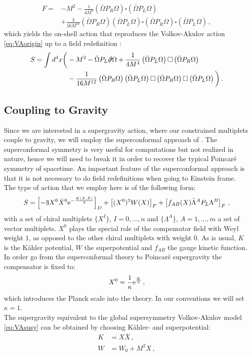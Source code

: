 \documentclass[a4paper,12pt]{report}
\newcommand{\be}{\begin{equation}}
\newcommand{\ee}{\end{equation}}
\newcommand{\bea}{\begin{equation}\begin{aligned}}
\newcommand{\eea}{\end{aligned}\end{equation}}
\def\rme{{\rm e}}
\begin{document}
\bea 
F = &-M^2 - \frac{1}{4 M^6} \left(\bar{\Omega}P_R  \Omega\right) \square \left(\bar{\Omega}P_L\Omega \right) \\
&+ \frac{3}{16 M^{14}} \left(\bar{\Omega}P_R  \Omega\right)  \left(\bar{\Omega}P_L\Omega \right) \square \left(\bar{\Omega}P_R  \Omega\right) \square \left(\bar{\Omega}P_L\Omega \right)\,,
\eea
which yields the on-shell action that reproduces the Volkov-Akulov action \eqref{eq:VAorigin} up to a field redefinition \cite{Kuzenko:2011tj}:
\bea 
S = \int d^4 x \bigg( &- M^2 - \bar{\Omega}P_L \slashed{\partial} \Omega + \frac{1}{4M^4} \left(\bar{\Omega}P_L\Omega \right) \square \left(\bar{\Omega}P_R\Omega\right)\\
&- \frac{1}{16 M^{12}} \left(\bar{\Omega}P_R\Omega\right)\left(\bar{\Omega}P_L\Omega \right) \square \left(\bar{\Omega}P_R\Omega\right)\square \left(\bar{\Omega}P_L\Omega \right) \bigg)\,.
\eea

\subsection{Coupling to Gravity}
\label{sec:couplinggravity}
Since we are interested in a supergravity action, where our constrained multiplets couple to gravity, we will employ the superconformal approach of \cite{Freedman:2012zz}. The superconformal symmetry is very useful for computations but not realized in nature, hence we will need to break it in order to recover the typical Poincar\'{e} symmetry of spacetime. An important feature of the superconformal approach is that it is not necessary to do field redefinitions when going to Einstein frame. The type of action that we employ here is of the following form:
\be
S = \left[-3 X^0 \bar{X}^0 \rme^{-\frac{K(X,\bar{X})}{3}}\right]_D + \left[(X^0)^3 W (X)\right]_F + \left[f_{AB}(X) \bar{\Lambda}^A P_L \Lambda^B \right]_F\,,
\label{eq:suconfact}
\ee
with a set of chiral multiplets $\{X^I\}$, $I = 0, \ldots , n$ and $\{\Lambda^A\}$, $A=1,\ldots , m$ a set of vector multiplets. $X^0$ plays the special role of the compensator field with Weyl weight $1$, as opposed to the other chiral multiplets with weight $0$. As is usual, $K$ is the Kähler potential, $W$ the superpotential and $f_{AB}$ the gauge kinetic function. In order go from the superconformal theory to Poincar\'{e} supergravity the compensator is fixed to:
\be 
X^0 = \frac{1}{\kappa} \rme^{\frac{K}{6}}\,,
\ee
which introduces the Planck scale into the theory. In our conventions we will set $\kappa = 1$.\\
The supergravity equivalent to the global supersymmetry Volkov-Akulov model \eqref{eq:VAsusy} can be obtained by choosing Kähler- and superpotential:
\bea 
K &= X\bar{X}\,,\\
W &= W_0 + M^2 X\,,
\eea
\end{document}
